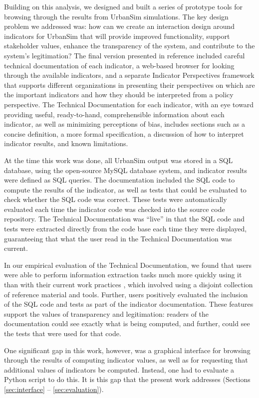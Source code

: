 Building on this analysis, we designed and built a series of prototype
tools for browsing through the results from UrbanSim simulations.  The key
design problem we addressed was: how can we create an interaction design
around indicators for UrbanSim that will provide improved functionality,
support stakeholder values, enhance the transparency of the system, and
contribute to the system's legitimation?  The final version presented in
reference \cite{borning-ecscw-2005} included careful technical
documentation of each indicator, a web-based browser for looking through
the available indicators, and a separate Indicator Perspectives framework
that supports different organizations in presenting their perspectives on
which are the important indicators and how they should be interpreted from
a policy perspective.  The Technical Documentation for each indicator, with
an eye toward providing useful, ready-to-hand, comprehensible information
about each indicator, as well as minimizing perceptions of bias, includes
sections such as a concise definition, a more formal specification, a
discussion of how to interpret indicator results, and known limitations.

At the time this work was done, all UrbanSim output was stored in a SQL
database, using the open-source MySQL database system, and indicator
results were defined as SQL queries.  The documentation included the
SQL code to compute the results of the indicator, as well as tests that
could be evaluated to check whether the SQL code was correct.  These tests
were automatically evaluated each time the indicator code was checked into
the source code
repository.  The Technical Documentation was ``live'' in that the SQL
code and tests were extracted directly from the code base each time they
were displayed, guaranteeing that what the user read in the Technical
Documentation was current.  

In our empirical evaluation of the Technical Documentation, we found that
users were able to perform information extraction tasks much more quickly using it than with their
current work practices \cite{borning-ecscw-2005}, which involved using a
disjoint collection of reference material and tools.
Further, users positively evaluated the inclusion of
the SQL code and tests as part of the indicator documentation.  These
features support the values of transparency and legitimation: readers of
the documentation could see exactly what is being computed, and further, could
see the tests that were used for that code.

One significant gap in this work, however, was a graphical interface for
browsing through the results of computing indicator values, as well as for
requesting that additional values of indicators be computed.  Instead, one
had to evaluate a Python script to do this.  It is this gap that the
present work addresses (Sections \ref{sec:interface} -- \ref{sec:evaluation}).

